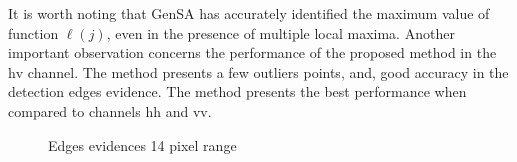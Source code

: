 \documentclass[journal]{IEEEtran}
\begin{document}
It is worth noting that GenSA has accurately identified the maximum value of function $\ell(j)$, even in the presence of multiple local maxima. Another important observation concerns the performance of the proposed method in the $\text{hv}$ channel. The method presents a few outliers points, and, good accuracy in the detection edges evidence. The method presents the best performance when compared to channels $\text{hh}$ and $\text{vv}$. 
   \begin{figure}[hbt]
	\centering
     \caption{Edges evidences 14 pixel range}
     \label{evidencias_hh_hv_vv} 
   \end{figure}
\end{document}
